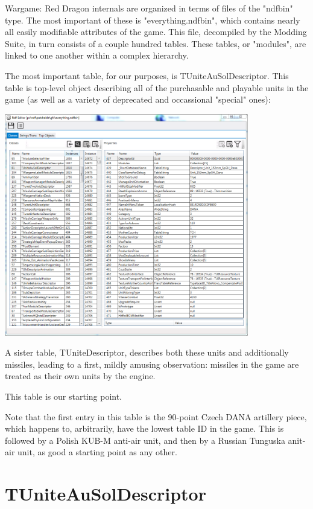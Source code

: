 \documentclass{article}
\begin{document}
Wargame: Red Dragon internals are organized in terms of files of the "ndfbin" type. The most important of these is "everything.ndfbin", which contains nearly all easily modifiable attributes of the game. This file, decompiled by the Modding Suite, in turn consists of a couple hundred tables. These tables, or "modules", are linked to one another within a complex hierarchy.

The most important table, for our purposes, is TUniteAuSolDescriptor. This table is top-level object describing all of the purchasable and playable units in the game (as well as a variety of deprecated and occassional "special" ones):

\includegraphics[width=0.8\textwidth]{screenshot_everything}


A sister table, TUniteDescriptor, describes both these units and additionally missiles, leading to a first, mildly amusing observation: missiles in the game are treated as their own units by the engine.

This table is our starting point.

Note that the first entry in this table is the 90-point Czech DANA artillery piece, which happens to, arbitrarily, have the lowest table ID in the game. This is followed by a Polish KUB-M anti-air unit, and then by a Russian Tunguska anit-air unit, as good a starting point as any other. 

\newpage

\section{TUniteAuSolDescriptor}
\end{document}
